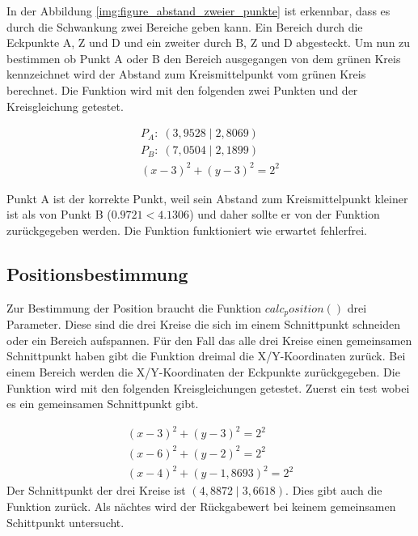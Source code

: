 In der Abbildung \ref{img:figure_abstand_zweier_punkte} ist erkennbar, dass es durch die Schwankung zwei Bereiche geben kann. Ein Bereich durch die Eckpunkte \si{A}, \si{Z} und \si{D} und ein zweiter durch \si{B}, \si{Z} und \si{D} abgesteckt. Um nun zu bestimmen ob Punkt \si{A} oder \si{B} den Bereich ausgegangen von dem grünen Kreis kennzeichnet wird der Abstand zum Kreismittelpunkt vom grünen Kreis berechnet. Die Funktion wird mit den folgenden zwei Punkten und der Kreisgleichung getestet.

\begin{equation*}
\label{eq:unit_test_abstand_zweier_punkte}
\begin{split}
P_{A}: \; (3,9528 \;|\; 2,8069)\\
P_{B}: \; (7,0504 \;|\; 2,1899)\\
(x - 3)^{2} + (y - 3)^{2} = 2^{2}
\end{split}
\end{equation*}

Punkt \si{A} ist der korrekte Punkt, weil sein Abstand zum Kreismittelpunkt kleiner ist als von Punkt \si{B} ($0.9721 < 4.1306$) und daher sollte er von der Funktion zurückgegeben werden. Die Funktion funktioniert wie erwartet fehlerfrei.

\subsection{Positionsbestimmung}
Zur Bestimmung der Position braucht die Funktion $calc_position()$ drei Parameter. Diese sind die drei Kreise die sich im einem Schnittpunkt schneiden oder ein Bereich aufspannen. Für den Fall das alle drei Kreise einen gemeinsamen Schnittpunkt haben gibt die Funktion dreimal die X/Y-Koordinaten zurück. Bei einem Bereich werden die X/Y-Koordinaten der Eckpunkte zurückgegeben. Die Funktion wird mit den folgenden Kreisgleichungen getestet.  Zuerst ein test wobei es ein gemeinsamen Schnittpunkt gibt.

\begin{equation*}
\label{eq:unit_test_positionsbestimmung}
\begin{split}
(x - 3)^{2} + (y - 3)^{2} = 2^{2} \\
(x - 6)^{2} + (y - 2)^{2} = 2^{2} \\
(x - 4)^{2} + (y - 1,8693)^{2} = 2^{2}
\end{split}
\end{equation*}
Der Schnittpunkt der drei Kreise ist $( 4,8872 \;|\; 3,6618)$. Dies gibt auch die Funktion zurück. Als nächtes wird der Rückgabewert bei keinem gemeinsamen Schittpunkt untersucht.

